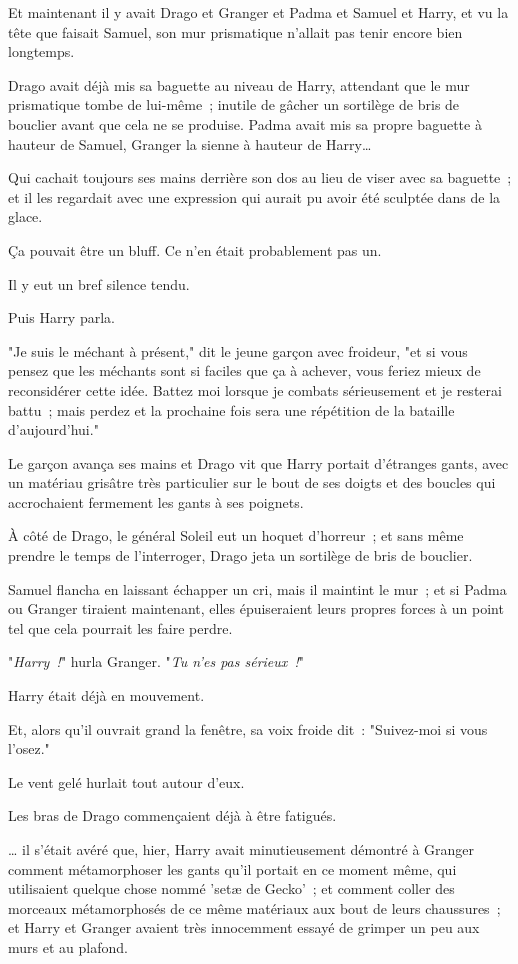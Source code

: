 Et maintenant il y avait Drago et Granger et Padma et Samuel et Harry, et vu la tête que faisait Samuel, son mur prismatique n'allait pas tenir encore bien longtemps.

Drago avait déjà mis sa baguette au niveau de Harry, attendant que le mur prismatique tombe de lui-même~; inutile de gâcher un sortilège de bris de bouclier avant que cela ne se produise. Padma avait mis sa propre baguette à hauteur de Samuel, Granger la sienne à hauteur de Harry…

Qui cachait toujours ses mains derrière son dos au lieu de viser avec sa baguette~; et il les regardait avec une expression qui aurait pu avoir été sculptée dans de la glace.

Ça pouvait être un bluff. Ce n'en était probablement pas un.

Il y eut un bref silence tendu.

Puis Harry parla.

"Je suis le méchant à présent," dit le jeune garçon avec froideur, "et si vous pensez que les méchants sont si faciles que ça à achever, vous feriez mieux de reconsidérer cette idée. Battez moi lorsque je combats sérieusement et je resterai battu~; mais perdez et la prochaine fois sera une répétition de la bataille d'aujourd'hui."

Le garçon avança ses mains et Drago vit que Harry portait d'étranges gants, avec un matériau grisâtre très particulier sur le bout de ses doigts et des boucles qui accrochaient fermement les gants à ses poignets.

À côté de Drago, le général Soleil eut un hoquet d'horreur~; et sans même prendre le temps de l'interroger, Drago jeta un sortilège de bris de bouclier.

Samuel flancha en laissant échapper un cri, mais il maintint le mur~; et si Padma ou Granger tiraient maintenant, elles épuiseraient leurs propres forces à un point tel que cela pourrait les faire perdre.

"\emph{Harry~!}" hurla Granger. "\emph{Tu n'es pas sérieux~!}"

Harry était déjà en mouvement.

Et, alors qu'il ouvrait grand la fenêtre, sa voix froide dit~: "Suivez-moi si vous l'osez."

\later

Le vent gelé hurlait tout autour d'eux.

Les bras de Drago commençaient déjà à être fatigués.

… il s'était avéré que, hier, Harry avait minutieusement démontré à Granger comment métamorphoser les gants qu'il portait en ce moment même, qui utilisaient quelque chose nommé 'setæ de Gecko'~; et comment coller des morceaux métamorphosés de ce même matériaux aux bout de leurs chaussures~; et Harry et Granger avaient très innocemment essayé de grimper un peu aux murs et au plafond.

